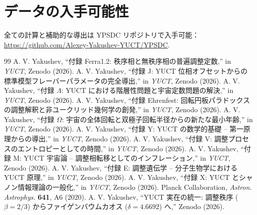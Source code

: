 \documentclass[12pt,a4paper]{article}
\begin{document}
	\section*{データの入手可能性}
	全ての計算と補助的な導出は YPSDC リポジトリで入手可能：\url{https://github.com/Alexey-Yakushev-YUCT/YPSDC}.
	
	\begin{thebibliography}{99}
		 A. V. Yakushev, ``付録 Ferra1.2: 秩序相と無秩序相の普遍調整定数,'' in \emph{YUCT}, Zenodo (2026).
		 A. V. Yakushev, ``付録 J: YUCT 位相オフセットからの標準模型フレーバーパラメータの完全導出,'' in \emph{YUCT}, Zenodo (2026).
		 A. V. Yakushev, ``付録 \(\Lambda\): YUCT における階層性問題と宇宙定数問題の解決,'' in \emph{YUCT}, Zenodo (2026).
		 A. V. Yakushev, ``付録 Ehrenfest: 回転円板パラドックスの調整解釈と非ユークリッド幾何学の創発,'' in \emph{YUCT}, Zenodo (2026).
		 A. V. Yakushev, ``付録 \(\Omega\): 宇宙の全体回転と双極子回転半径からの新たな最小年齢,'' in \emph{YUCT}, Zenodo (2026).
		 A. V. Yakushev, ``付録 Y: YUCT の数学的基礎 – 第一原理からの導出,'' in \emph{YUCT}, Zenodo (2026).
		 A. V. Yakushev, ``付録 V: 調整プロセスのエントロピーとしての時間,'' in \emph{YUCT}, Zenodo (2026).
		 A. V. Yakushev, ``付録 M: YUCT 宇宙論 – 調整相転移としてのインフレーション,'' in \emph{YUCT}, Zenodo (2026).
		 A. V. Yakushev, ``付録 E: 調整遺伝学 – 分子生物学における YUCT 原理,'' in \emph{YUCT}, Zenodo (2026).
		 A. V. Yakushev, ``付録 X: YUCT とシャノン情報理論の一般化,'' in \emph{YUCT}, Zenodo (2026).
		 Planck Collaboration, \emph{Astron. Astrophys.} \textbf{641}, A6 (2020).
		 A. V. Yakushev, ``YUCT 実在の統一: 調整秩序 (\(\beta = 2/3\)) からファイゲンバウムカオス (\(\delta = 4.6692\)) へ,'' Zenodo (2026).
	\end{thebibliography}
	
\end{document}
